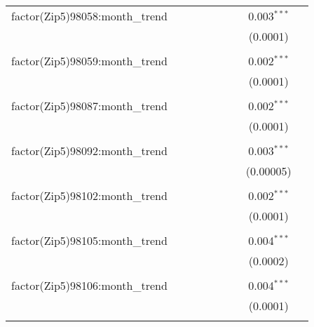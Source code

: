 \begin{table}[H]
{\begin{tabular}{@{\extracolsep{5pt}}lcccccccc}
  factor(Zip5)98058:month\_trend &  &  &  &  &  &  & 0.003$^{***}$ &  \\  

   &  &  &  &  &  &  & (0.0001) &  \\  

   & & & & & & & & \\  

  factor(Zip5)98059:month\_trend &  &  &  &  &  &  & 0.002$^{***}$ &  \\  

   &  &  &  &  &  &  & (0.0001) &  \\  

   & & & & & & & & \\  

  factor(Zip5)98087:month\_trend &  &  &  &  &  &  & 0.002$^{***}$ &  \\  

   &  &  &  &  &  &  & (0.0001) &  \\  

   & & & & & & & & \\  

  factor(Zip5)98092:month\_trend &  &  &  &  &  &  & 0.003$^{***}$ &  \\  

   &  &  &  &  &  &  & (0.00005) &  \\  

   & & & & & & & & \\  

  factor(Zip5)98102:month\_trend &  &  &  &  &  &  & 0.002$^{***}$ &  \\  

   &  &  &  &  &  &  & (0.0001) &  \\  

   & & & & & & & & \\  

  factor(Zip5)98105:month\_trend &  &  &  &  &  &  & 0.004$^{***}$ &  \\  

   &  &  &  &  &  &  & (0.0002) &  \\  

   & & & & & & & & \\  

  factor(Zip5)98106:month\_trend &  &  &  &  &  &  & 0.004$^{***}$ &  \\  

   &  &  &  &  &  &  & (0.0001) &  \\  

   & & & & & & & & \\  


\end{tabular}}
\end{table}
